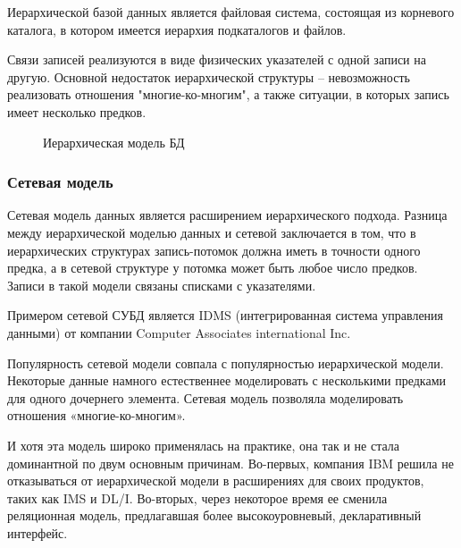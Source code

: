 \documentclass[12pt]{article}
\begin{document}
Иерархической базой данных является файловая система, состоящая из корневого каталога, в котором имеется иерархия подкаталогов и файлов.

Связи записей реализуются в виде физических указателей с одной записи на другую. Основной недостаток иерархической структуры – невозможность реализовать отношения "многие-ко-многим", а также ситуации, в которых запись имеет несколько предков. \cite{0}

\begin{figure}[h]
	\caption{Иерархическая модель БД}
	\label{fig:image}
\end{figure}

\subsubsection{Сетевая модель}
\setcounter{subsubsection}{2}

Сетевая модель данных является расширением иерархического подхода. 
Разница между иерархической моделью данных и сетевой заключается в том, что в иерархических структурах запись-потомок должна иметь в точности одного предка, а в сетевой структуре у потомка может быть любое число предков. 
Записи в такой модели связаны списками с указателями.

Примером сетевой СУБД является IDMS (интегрированная система управления данными) от компании Computer Associates international Inc.

Популярность сетевой модели совпала с популярностью иерархической модели. 
Некоторые данные намного естественнее моделировать с несколькими предками для одного дочернего элемента. 
Сетевая модель позволяла моделировать отношения «многие-ко-многим».

И хотя эта модель широко применялась на практике, она так и не стала доминантной по двум основным причинам. 
Во-первых, компания IBM решила не отказываться от иерархической модели в расширениях для своих продуктов, таких как IMS и DL/I. 
Во-вторых, через некоторое время ее сменила реляционная модель, предлагавшая более высокоуровневый, декларативный интерфейс. \cite{0}
\end{document}
